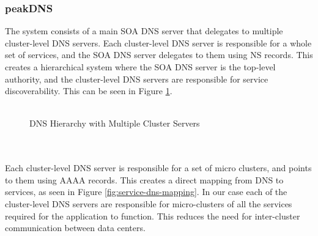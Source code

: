 \documentclass[12pt]{article}
\begin{document}
\subsubsection{peakDNS}
The system consists of a main SOA DNS server that delegates to multiple cluster-level DNS servers.
Each cluster-level DNS server is responsible for a whole set of services, and the SOA DNS server delegates to them using NS records.
This creates a hierarchical system where the SOA DNS server is the top-level authority, and the cluster-level DNS servers are responsible for service discoverability.
This can be seen in Figure \ref{fig:dns-hierarchy}.
\\
\\
\begin{figure}[h]
    \centering
    \caption{DNS Hierarchy with Multiple Cluster Servers}
    \label{fig:dns-hierarchy}
\end{figure}
\\
\\
Each cluster-level DNS server is responsible for a set of micro clusters, and points to them using AAAA records.
This creates a direct mapping from DNS to services, as seen in Figure \ref{fig:service-dns-mapping}.
In our case each of the cluster-level DNS servers are responsible for micro-clusters of all the services required 
for the application to function. This reduces the need for inter-cluster communication between data centers.
\\
\end{document}
